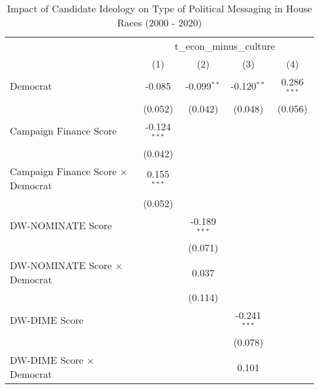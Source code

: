 
\begin{table}[htbp]
   \caption{Impact of Candidate Ideology on Type of Political Messaging in House Races (2000 - 2020)}
   \bigskip
   \centering
   \begin{tabular}{lcccc}
      \toprule
       & \multicolumn{4}{c}{t\_econ\_minus\_culture}\\
                                                                & (1)            & (2)            & (3)            & (4)\\  
      \midrule 
      Democrat                                                  & -0.085         & -0.099$^{**}$  & -0.120$^{**}$  & 0.286$^{***}$\\   
                                                                & (0.052)        & (0.042)        & (0.048)        & (0.056)\\   
      Campaign Finance Score                                    & -0.124$^{***}$ &                &                &   \\   
                                                                & (0.042)        &                &                &   \\   
      Campaign Finance Score $\times$ Democrat                  & 0.155$^{***}$  &                &                &   \\   
                                                                & (0.052)        &                &                &   \\   
      DW-NOMINATE Score                                         &                & -0.189$^{***}$ &                &   \\   
                                                                &                & (0.071)        &                &   \\   
      DW-NOMINATE Score $\times$ Democrat                       &                & 0.037          &                &   \\   
                                                                &                & (0.114)        &                &   \\   
      DW-DIME Score                                             &                &                & -0.241$^{***}$ &   \\   
                                                                &                &                & (0.078)        &   \\   
      DW-DIME Score $\times$ Democrat                           &                &                & 0.101          &   \\   

\end{tabular}
\end{table}
